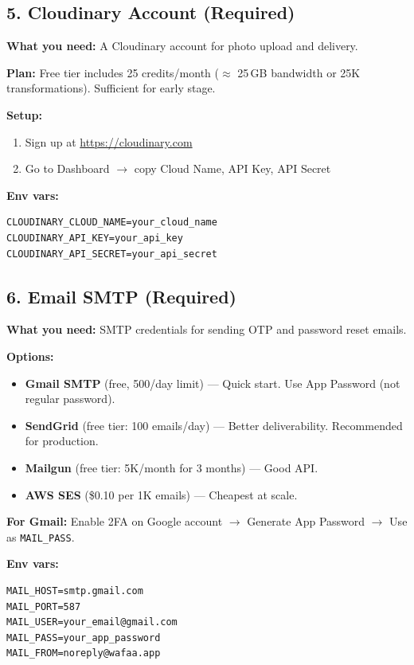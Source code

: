 \documentclass[a4paper,11pt]{article}
\begin{document}
\subsection{5. Cloudinary Account (Required)}

\begin{clientbox}
\textbf{What you need:} A Cloudinary account for photo upload and delivery.

\textbf{Plan:} Free tier includes 25 credits/month ($\approx$ 25\,GB bandwidth or 25K transformations). Sufficient for early stage.

\textbf{Setup:}
\begin{enumerate}[leftmargin=1.5em]
    \item Sign up at \url{https://cloudinary.com}
    \item Go to Dashboard $\to$ copy Cloud Name, API Key, API Secret
\end{enumerate}

\textbf{Env vars:}
\begin{lstlisting}
CLOUDINARY_CLOUD_NAME=your_cloud_name
CLOUDINARY_API_KEY=your_api_key
CLOUDINARY_API_SECRET=your_api_secret
\end{lstlisting}
\end{clientbox}

\subsection{6. Email SMTP (Required)}

\begin{clientbox}
\textbf{What you need:} SMTP credentials for sending OTP and password reset emails.

\textbf{Options:}
\begin{itemize}[leftmargin=1.5em]
    \item \textbf{Gmail SMTP} (free, 500/day limit) --- Quick start. Use App Password (not regular password).
    \item \textbf{SendGrid} (free tier: 100 emails/day) --- Better deliverability. Recommended for production.
    \item \textbf{Mailgun} (free tier: 5K/month for 3 months) --- Good API.
    \item \textbf{AWS SES} (\$0.10 per 1K emails) --- Cheapest at scale.
\end{itemize}

\textbf{For Gmail:} Enable 2FA on Google account $\to$ Generate App Password $\to$ Use as \texttt{MAIL\_PASS}.

\textbf{Env vars:}
\begin{lstlisting}
MAIL_HOST=smtp.gmail.com
MAIL_PORT=587
MAIL_USER=your_email@gmail.com
MAIL_PASS=your_app_password
MAIL_FROM=noreply@wafaa.app
\end{lstlisting}
\end{clientbox}
\end{document}
